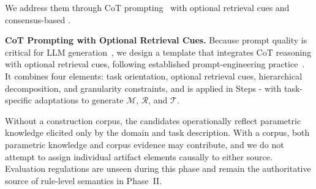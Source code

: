 We address them through CoT prompting~\cite{wei2022chain} with optional
retrieval cues and consensus-based \strategy.





\noindent
\textbf{CoT Prompting with Optional Retrieval Cues.}
Because prompt quality is critical for LLM generation~\cite{white2023prompt}, we design a template that integrates CoT reasoning with optional retrieval cues, following established prompt-engineering practice~\cite{chen2025unleashing,sahoo2024systematic}.
It combines four elements: task orientation, optional retrieval cues,
hierarchical decomposition, and granularity constraints, and is applied in
Steps - with task-specific adaptations to generate
$\mathcal{M}$, $\mathcal{R}$, and $\mathcal{T}$.

Without a construction corpus,
the candidates operationally reflect parametric knowledge elicited only by the
domain and task description. With a corpus, both parametric knowledge and
corpus evidence may contribute, and we do not attempt to assign individual
artifact elements causally to either source. Evaluation regulations are unseen
during this phase and remain the authoritative source of rule-level semantics
in Phase~II.


